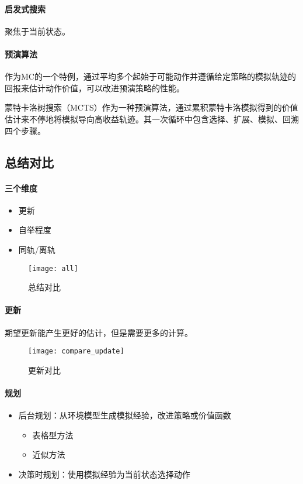 \documentclass[
12pt, %
a4paper, 
oneside, %
headinclude,footinclude, %
]{scrartcl}
\begin{document}
\paragraph{启发式搜索}
聚焦于当前状态。
\paragraph{预演算法}
作为MC的一个特例，通过平均多个起始于可能动作并遵循给定策略的模拟轨迹的回报来估计动作价值，可以改进预演策略的性能。

蒙特卡洛树搜索（MCTS）作为一种预演算法，通过累积蒙特卡洛模拟得到的价值估计来不停地将模拟导向高收益轨迹。其一次循环中包含选择、扩展、模拟、回溯四个步骤。
\subsection{总结对比}
\begin{minipage}{0.3\textwidth}
\paragraph{三个维度}   
\begin{itemize}
\item 更新
\item 自举程度
\item 同轨/离轨
\end{itemize}
\end{minipage}
\hfill
\begin{minipage}{0.6\textwidth}
\begin{figure}[H]
\centering
\texttt{[image: all]}
\caption[总结对比]{总结对比}
\end{figure}
\end{minipage}
\paragraph{更新}
期望更新能产生更好的估计，但是需要更多的计算。

\begin{figure}[H]
\centering
\texttt{[image: compare\_update]}
\caption[更新对比]{更新对比}
\end{figure}
\paragraph{规划}
\begin{itemize}
\item 后台规划：从环境模型生成模拟经验，改进策略或价值函数
\begin{itemize}
\item 表格型方法
\item 近似方法
\end{itemize}
\item 决策时规划：使用模拟经验为当前状态选择动作
\end{itemize}
\end{document}
